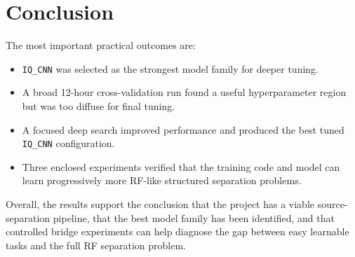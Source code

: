 \documentclass[11pt]{article}
\begin{document}
\section{Conclusion}
The most important practical outcomes are:
\begin{itemize}
    \item \texttt{IQ\_CNN} was selected as the strongest model family for deeper tuning.
    \item A broad 12-hour cross-validation run found a useful hyperparameter region but was too diffuse for final tuning.
    \item A focused deep search improved performance and produced the best tuned \texttt{IQ\_CNN} configuration.
    \item Three enclosed experiments verified that the training code and model can learn progressively more RF-like structured separation problems.
\end{itemize}

Overall, the results support the conclusion that the project has a viable source-separation pipeline, that the best model family has been identified, and that controlled bridge experiments can help diagnose the gap between easy learnable tasks and the full RF separation problem.
\end{document}
